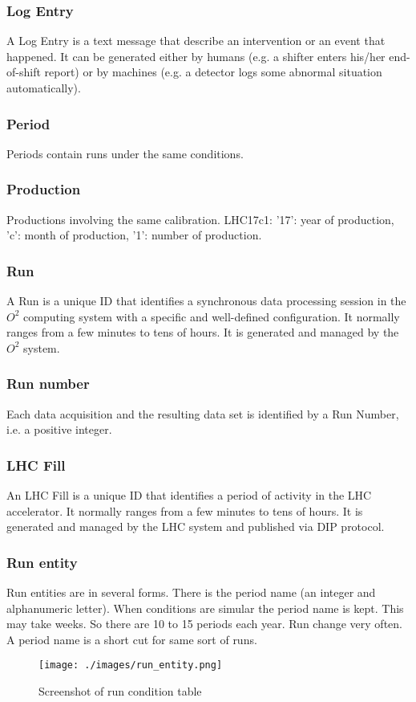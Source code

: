 \subsubsection{Log Entry}
A Log Entry is a text message that describe an intervention or an event that happened. It can be generated either by humans (e.g. a shifter enters his/her end-of-shift report) or by machines (e.g. a detector logs some abnormal situation automatically). 

\subsubsection{Period}
Periods contain runs under the same conditions.

\subsubsection{Production}
Productions involving the same calibration. LHC17c1: '17': year of production, 'c': month of production, '1': number of production.

\subsubsection{Run}
A Run is a unique ID that identifies a synchronous data processing session in the $O^2$ computing system with a specific and well-defined configuration. It normally ranges from a few minutes to tens of hours. It is generated and managed by the $O^2$ system. 

\subsubsection{Run number}
Each data acquisition and the resulting data set is identified by a Run Number, i.e. a positive integer.

\subsubsection{LHC Fill}
An LHC Fill is a unique ID that identifies a period of activity in the LHC accelerator. It normally ranges from a few minutes to tens of hours. It is generated and managed by the LHC system and published via DIP protocol. 

\subsubsection{Run entity}
Run entities are in several forms. There is the period name (an integer and alphanumeric letter). When conditions are simular the period name is kept. This may take weeks. So there are 10 to 15 periods each year. Run change very often. A period name is a short cut for same sort of runs.
\begin{figure}
  \begin{center}
    \texttt{[image: ./images/run\_entity.png]}
    \caption{Screenshot of run condition table}
    \label{fig:run_con_table}
  \end{center}
\end{figure}

